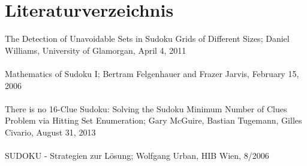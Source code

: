 \documentclass[11pt,a4paper]{article}
\begin{document}
\section{Literaturverzeichnis}
The Detection of Unavoidable Sets in Sudoku Grids of Different
Sizes; Daniel Williams, University of Glamorgan, April 4, 2011\\
\ \\
Mathematics of Sudoku I; Bertram Felgenhauer and Frazer Jarvis, February 15, 2006\\
\ \\
There is no 16-Clue Sudoku: Solving the Sudoku Minimum Number of Clues Problem via Hitting Set Enumeration; Gary McGuire, Bastian Tugemann, Gilles Civario, August 31, 2013\\
\ \\
SUDOKU - Strategien zur Lösung; Wolfgang Urban, HIB Wien,  8/2006 
\end{document}
